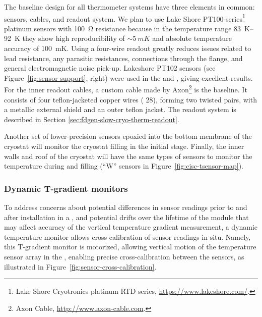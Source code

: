 The baseline design for all thermometer systems have three elements in
common: sensors, cables, and readout system. We plan to use Lake Shore
PT100-series\footnote{Lake Shore Cryotronics\texttrademark{} platinum RTD series,
  \url{https://www.lakeshore.com/}.} %
platinum sensors with \SI{100}{\ohm} resistance %
because in
the temperature range \SIrange{83}{92}{K} %
they 
show high reproducibility of $\sim\SI{5}{mK}$ and absolute temperature
accuracy of \SI{100}{mK}.  Using a four-wire readout greatly reduces
issues related to lead resistance, any parasitic resistances,
connections through the flange, and general electromagnetic noise
pick-up. Lakeshore PT102 sensors (see
Figure~\ref{fig:sensor-support}, right) were used in the  and , %
giving excellent results. For the inner
readout cables, a custom cable made by Axon\footnote{Axon\texttrademark{} Cable, \url{http://www.axon-cable.com}.}
is the baseline. It
consists of four teflon-jacketed copper wires ( 28), forming two
twisted pairs, with a metallic external shield and an outer teflon
jacket.
The readout system is described in Section \ref{sec:fdgen-slow-cryo-therm-readout}.

Another set of lower-precision sensors epoxied into the bottom membrane of the cryostat will monitor  the cryostat filling in the initial stage.   
Finally, the inner walls and roof of the cryostat will have the same types of sensors to monitor the temperature during \cooldown and filling (``W'' sensors in Figure~\ref{fig:cisc-tsensor-map}).
 

\subsubsection{Dynamic T-gradient monitors}
\label{sec:fdgen-slow-cryo-dynamic-therm}

 To address concerns about potential differences in sensor readings prior to and after installation in a , and potential drifts over the lifetime of the %
 module that may affect accuracy of the vertical temperature gradient measurement, %
 a dynamic temperature monitor allows cross-calibration of sensor readings %
 in situ.
Namely, this T-gradient monitor is motorized, allowing vertical motion of the temperature sensor array %
in the , %
enabling precise cross-calibration between the sensors, %
as illustrated in Figure~\ref{fig:sensor-cross-calibration}.  

